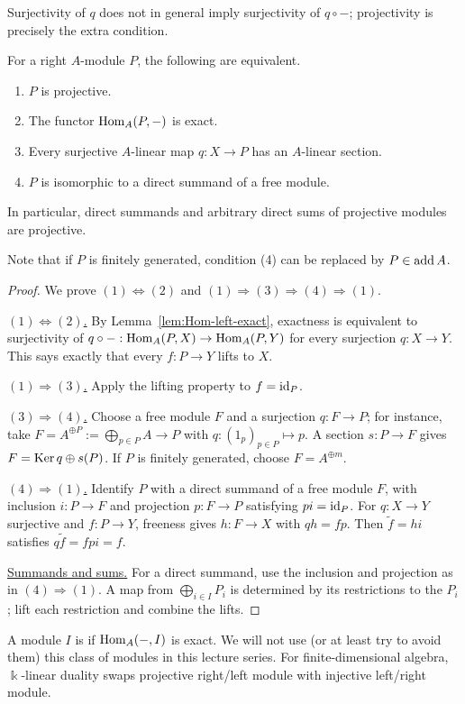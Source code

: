 Surjectivity of $q$ does not in general imply surjectivity of $q\circ-$; projectivity is precisely the extra condition.

\begin{proposition}\label{prop:projective-characterisations}
For a right $A$-module $P$, the following are equivalent.
\begin{enumerate}
\item $P$ is projective.
\item The functor $\operatorname{Hom}\nolimits_A(P,-)$ is exact.
\item Every surjective $A$-linear map $q:X\to P$ has an $A$-linear section.
\item $P$ is isomorphic to a direct summand of a free module.
\end{enumerate}
In particular, direct summands and arbitrary direct sums of projective modules are projective.
\end{proposition}
Note that if $P$ is finitely generated, condition (4) can be replaced by $P\in\operatorname{add} A$.

\begin{proof}
We prove $(1)\Leftrightarrow(2)$ and $(1)\Rightarrow(3)\Rightarrow(4)\Rightarrow(1)$.

\underline{$(1)\Leftrightarrow(2)$.}
By Lemma~\ref{lem:Hom-left-exact}, exactness is equivalent to surjectivity of
$q\circ-:\operatorname{Hom}\nolimits_A(P,X)\to\operatorname{Hom}\nolimits_A(P,Y)$ for every surjection $q:X\to Y$.
This says exactly that every $f:P\to Y$ lifts to $X$.

\underline{$(1)\Rightarrow(3)$.}
Apply the lifting property to $f=\operatorname{id}_P$.

\underline{$(3)\Rightarrow(4)$.}
Choose a free module $F$ and a surjection $q:F\to P$; for instance, take $F=A^{\oplus P}:=\bigoplus_{p\in P}A\to P$ with $q:(1_p)_{p\in P}\mapsto p$.
A section $s:P\to F$ gives $F=\operatorname{Ker}\nolimits q\oplus s(P)$.
If $P$ is finitely generated, choose $F=A^{\oplus m}$.

\underline{$(4)\Rightarrow(1)$.}
Identify $P$ with a direct summand of a free module $F$, with inclusion $i:P\to F$ and projection $p:F\to P$ satisfying $pi=\operatorname{id}_P$.
For $q:X\to Y$ surjective and $f:P\to Y$, freeness gives $h:F\to X$ with $qh=fp$.
Then $\widetilde f=hi$ satisfies $q\widetilde f=fpi=f$.

\underline{Summands and sums.}
For a direct summand, use the inclusion and projection as in $(4)\Rightarrow(1)$.
A map from $\bigoplus_{i\in I}P_i$ is determined by its restrictions to the $P_i$; lift each restriction and combine the lifts.
\end{proof}
\begin{supplementary}
\begin{remark}
A module $I$ is  if $\operatorname{Hom}\nolimits_A(-,I)$ is exact.  We will not use (or at least try to avoid them) this class of modules in this lecture series.  For finite-dimensional algebra, $\Bbbk$-linear duality swaps projective right/left module with injective left/right module.
\end{remark}
\end{supplementary}

